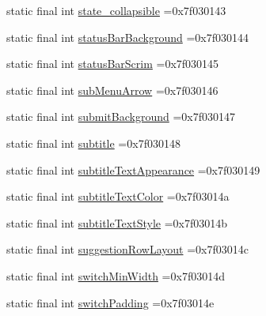 \begin{DoxyCompactItemize}
\item 
static final int \mbox{\hyperlink{classbr_1_1unb_1_1cic_1_1mp_1_1marketmaster_1_1test_1_1R_1_1attr_afe347c2697d55ff96024bf896d4a4a14}{state\+\_\+collapsible}} =0x7f030143
\item 
static final int \mbox{\hyperlink{classbr_1_1unb_1_1cic_1_1mp_1_1marketmaster_1_1test_1_1R_1_1attr_a0faf14cbf858f8da2fd345249e235e0d}{status\+Bar\+Background}} =0x7f030144
\item 
static final int \mbox{\hyperlink{classbr_1_1unb_1_1cic_1_1mp_1_1marketmaster_1_1test_1_1R_1_1attr_aae619a4f76e6376ef6d312195975306b}{status\+Bar\+Scrim}} =0x7f030145
\item 
static final int \mbox{\hyperlink{classbr_1_1unb_1_1cic_1_1mp_1_1marketmaster_1_1test_1_1R_1_1attr_a139df64f92743529fc1bfcd876fed695}{sub\+Menu\+Arrow}} =0x7f030146
\item 
static final int \mbox{\hyperlink{classbr_1_1unb_1_1cic_1_1mp_1_1marketmaster_1_1test_1_1R_1_1attr_aa15bdbee970b637758c86ed3b50319ea}{submit\+Background}} =0x7f030147
\item 
static final int \mbox{\hyperlink{classbr_1_1unb_1_1cic_1_1mp_1_1marketmaster_1_1test_1_1R_1_1attr_a2391cc23ec9655341b074bbefa0b73dd}{subtitle}} =0x7f030148
\item 
static final int \mbox{\hyperlink{classbr_1_1unb_1_1cic_1_1mp_1_1marketmaster_1_1test_1_1R_1_1attr_a434ae5efca908f56d1ff2d4fbef53f79}{subtitle\+Text\+Appearance}} =0x7f030149
\item 
static final int \mbox{\hyperlink{classbr_1_1unb_1_1cic_1_1mp_1_1marketmaster_1_1test_1_1R_1_1attr_a3bdbe075904084a9a8f8a999114a9c6a}{subtitle\+Text\+Color}} =0x7f03014a
\item 
static final int \mbox{\hyperlink{classbr_1_1unb_1_1cic_1_1mp_1_1marketmaster_1_1test_1_1R_1_1attr_ab320a946710633c857460444e736520f}{subtitle\+Text\+Style}} =0x7f03014b
\item 
static final int \mbox{\hyperlink{classbr_1_1unb_1_1cic_1_1mp_1_1marketmaster_1_1test_1_1R_1_1attr_a31fbcefe7ba9d97cfd0a57ca3d987343}{suggestion\+Row\+Layout}} =0x7f03014c
\item 
static final int \mbox{\hyperlink{classbr_1_1unb_1_1cic_1_1mp_1_1marketmaster_1_1test_1_1R_1_1attr_ad487f0ee0584408feb080cb004f44a74}{switch\+Min\+Width}} =0x7f03014d
\item 
static final int \mbox{\hyperlink{classbr_1_1unb_1_1cic_1_1mp_1_1marketmaster_1_1test_1_1R_1_1attr_a62ba8fca8428627992691480cc715d13}{switch\+Padding}} =0x7f03014e
\item 

\end{DoxyCompactItemize}
